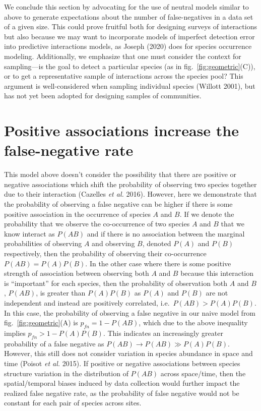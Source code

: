 \documentclass[11pt]{article}
\begin{document}
We conclude this section by advocating for the use of neutral models
similar to above to generate expectations about the number of
false-negatives in a data set of a given size. This could prove fruitful
both for designing surveys of interactions but also because we may want
to incorporate models of imperfect detection error into predictive
interactions models, as Joseph (2020) does for species occurrence
modeling. Additionally, we emphasize that one must consider the context
for sampling---is the goal to detect a particular species (as in
fig.~\ref{fig:geometric}(C)), or to get a representative sample of
interactions across the species pool? This argument is well-considered
when sampling individual species (Willott 2001), but has not yet been
adopted for designing samples of communities.

\hypertarget{positive-associations-increase-the-false-negative-rate}{%
\section{Positive associations increase the false-negative
rate}\label{positive-associations-increase-the-false-negative-rate}}

This model above doesn't consider the possibility that there are
positive or negative associations which shift the probability of
observing two species together due to their interaction (Cazelles
\emph{et al.} 2016). However, here we demonstrate that the probability
of observing a false negative can be higher if there is some positive
association in the occurrence of species \(A\) and \(B\). If we denote
the probability that we observe the co-occurrence of two species \(A\)
and \(B\) that we know interact as \(P(AB)\) and if there is no
association between the marginal probabilities of observing \(A\) and
observing \(B\), denoted \(P(A)\) and \(P(B)\) respectively, then the
probability of observing their co-occurrence \(P(AB) = P(A)P(B)\). In
the other case where there is some positive strength of association
between observing both \(A\) and \(B\) because this interaction is
``important'' for each species, then the probability of observation both
\(A\) and \(B\), \(P(AB)\), is greater than \(P(A)P(B)\) as \(P(A)\) and
\(P(B)\) are not independent and instead are positively correlated,
i.e.~\(P(AB)> P(A)P(B)\). In this case, the probability of observing a
false negative in our naive model from fig.~\ref{fig:geometric}(A) is
\(p_{fn}= 1-P(AB)\), which due to the above inequality implies
\(p_{fn} >1-P(A)P(B)\). This indicates an increasingly greater
probability of a false negative as \(P(AB) \to P(AB) \gg P(A)P(B)\).
However, this still does not consider variation in species abundance in
space and time (Poisot \emph{et al.} 2015). If positive or negative
associations between species structure variation in the distribution of
\(P(AB)\) across space/time, then the spatial/temporal biases induced by
data collection would further impact the realized false negative rate,
as the probability of false negative would not be constant for each pair
of species across sites.
\end{document}

